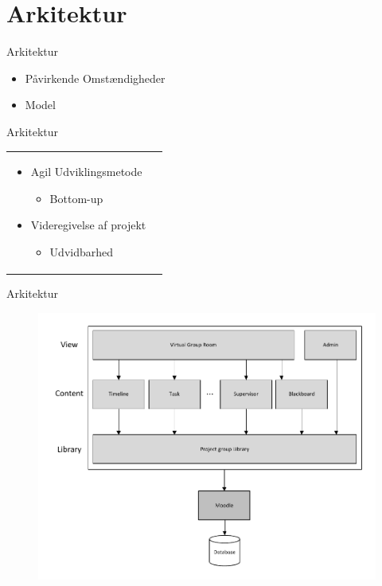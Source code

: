 \section{Arkitektur}

\begin{frame}{Arkitektur}
\begin{itemize}
	\item P\aa{}virkende Omst\ae{}ndigheder
	\item Model
\end{itemize}
\end{frame}


\begin{frame}{Arkitektur}

\begin{tabular}{ p{6cm}  r }
\begin{itemize}
	\item Agil Udviklingsmetode
	\begin{itemize}
		\item Bottom-up  
	\end{itemize}
	\item Videregivelse af projekt
	\begin{itemize}
		\item Udvidbarhed
	\end{itemize}
\end{itemize} 

\end{tabular}



\end{frame}


\begin{frame}{Arkitektur}
\begin{figure}%
\includegraphics[width=\columnwidth]{input/assets/architecture}%
\end{figure}	
\end{frame}